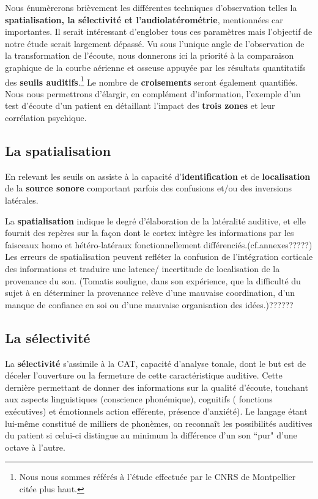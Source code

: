 Nous énumèrerons brièvement les
différentes techniques d'observation telles la
\textbf{spatialisation, la
sélectivité et l'audiolatérométrie}, mentionnées car importantes.
 Il serait intéressant d'englober tous ces paramètres mais
  l'objectif de notre étude serait largement dépassé.
Vu sous l'unique angle de l'observation de la transformation de l'écoute, nous
donnerons ici la priorité à la comparaison graphique  
de la courbe aérienne et osseuse appuyée par les résultats
quantitatifs des \textbf{seuils auditifs}.\footnote{ Nous nous sommes référés à  
  l'étude effectuée par le CNRS de Montpellier citée plus haut.}
Le nombre de \textbf{croisements }seront
également quantifiés.
Nous nous permettrons d'élargir, en
complément d'information, l'exemple d'un test d'écoute d'un patient en détaillant l'impact
des\textbf{ trois zones} et leur corrélation psychique.



\subsection{La spatialisation}

  


En relevant les seuils on assiste à la capacité 
d'\textbf{identification} et de \textbf{localisation} de la
\textbf{source sonore} comportant parfois des confusions et/ou des inversions
latérales.

La \textbf{spatialisation}
indique le degré d'élaboration de la latéralité auditive,
et elle fournit des repères sur la façon dont le cortex intègre les informations
par les faisceaux homo et hétéro-latéraux fonctionnellement différenciés.(cf.annexes?????)
Les erreurs de spatialisation peuvent refléter la confusion
de l'intégration corticale des informations et traduire une latence/
incertitude de localisation de la provenance du son.
(Tomatis souligne, dans son expérience, que la difficulté du sujet à en déterminer la provenance relève d'une mauvaise coordination, d'un manque de confiance en soi ou
d'une mauvaise organisation des idées.)??????


\subsection{La sélectivité}

  
  La \textbf{sélectivité }s'assimile  à  la CAT, capacité d'analyse tonale,\autocite{tomatis:loreille} dont 
le but est de déceler l'ouverture ou la fermeture de cette
caractéristique auditive. Cette dernière permettant de donner des informations sur la
qualité d'écoute, touchant aux aspects  linguistiques (conscience
phonémique), cognitifs ( fonctions exécutives) et émotionnels action
efférente, présence d'anxiété).
Le langage étant lui-même constitué de milliers de phonèmes, on reconnaît les possibilités auditives du patient si celui-ci  distingue au minimum la différence d'un son ``pur" d'une octave à l'autre.  


